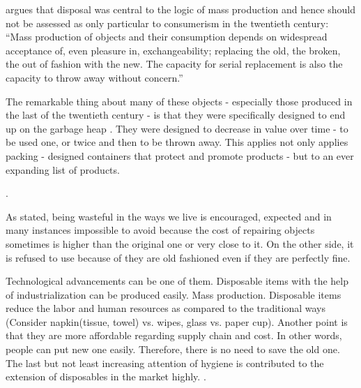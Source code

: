 \cite[9]{hawkins2001plastic} argues that disposal was central to the logic of mass production and hence should not be assessed as only particular to consumerism in the twentieth century: “Mass production of objects and their consumption depends on widespread acceptance of, even pleasure in, exchangeability; replacing the old, the broken, the out of fashion with the new. The capacity for serial replacement is also the capacity to throw away without concern.”


The remarkable thing about many of these objects - especially those produced in the last of the twentieth century - is that they were specifically designed to end up on the garbage heap \citep{cerny1996recycled}. They were designed to decrease in value over time - to be used one, or twice and then to be thrown away. This applies not only applies packing - designed containers that protect and promote products - but to an ever expanding list of products.

 \citep{cerny1996recycled}.

As stated, being wasteful in the ways we live is encouraged, expected and in many instances impossible to avoid \citep[viii]{hawkins2005ethics} because the cost of repairing objects sometimes is higher than the original one or very close to it. On the other side, it is refused to use because of they are old fashioned even if they are perfectly fine.





%
%
Technological advancements can be one of them. Disposable items with the help of industrialization can be produced easily. Mass production. Disposable items reduce the labor and human resources as compared to the traditional ways (Consider napkin(tissue, towel) vs. wipes, glass vs. paper cup). Another point is that they are more affordable regarding supply chain and cost. In other words, people can put new one easily. Therefore, there is no need to save the old one. The last but not least increasing attention of hygiene is contributed to the extension of disposables in the market highly.  \citep{kennedy2007ontology}.

